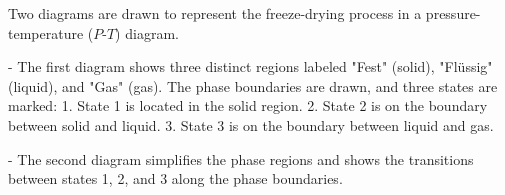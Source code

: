 Two diagrams are drawn to represent the freeze-drying process in a pressure-temperature (\(P\)-\(T\)) diagram.  

- The first diagram shows three distinct regions labeled "Fest" (solid), "Flüssig" (liquid), and "Gas" (gas). The phase boundaries are drawn, and three states are marked:  
  1. State 1 is located in the solid region.  
  2. State 2 is on the boundary between solid and liquid.  
  3. State 3 is on the boundary between liquid and gas.  

- The second diagram simplifies the phase regions and shows the transitions between states 1, 2, and 3 along the phase boundaries.